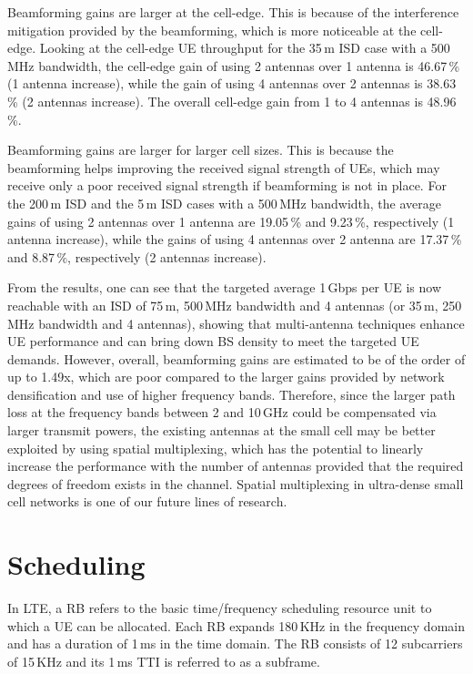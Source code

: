 \documentclass{IEEEtran}
\begin{document}
Beamforming gains are larger at the cell-edge.
This is because of the interference mitigation provided by the beamforming,
which is more noticeable at the cell-edge.
Looking at the cell-edge \ac{UE} throughput for the 35\,m \ac{ISD} case with a 500\,MHz bandwidth,
the cell-edge gain of using 2 antennas over 1 antenna is 46.67\,\% (1 antenna increase),
while the gain of using 4 antennas over 2 antennas is 38.63\,\% (2 antennas increase).
The overall cell-edge gain from 1 to 4 antennas is 48.96\,\%.



Beamforming gains are larger for larger cell sizes.
This is because the beamforming helps improving the received signal strength of \acp{UE},
which may receive only a poor received signal strength if beamforming is not in place.
For the 200\,m \ac{ISD} and the 5\,m \ac{ISD} cases with a 500\,MHz bandwidth,
the average gains of using 2 antennas over 1 antenna are 19.05\,\% and 9.23\,\%, respectively (1 antenna increase),
while the gains of using 4 antennas over 2 antenna are 17.37\,\% and 8.87\,\%, respectively (2 antennas increase).

From the results,
one can see that the targeted average 1\,Gbps per \ac{UE} is now reachable with an \ac{ISD} of 75\,m, 500\,MHz bandwidth and 4 antennas (or 35\,m, 250\,MHz bandwidth and 4 antennas),
showing that multi-antenna techniques enhance \ac{UE} performance and can bring down \ac{BS} density
to meet the targeted \ac{UE} demands.
However, overall, beamforming gains are estimated to be of the order of up to 1.49x,
which are poor compared to the larger gains provided by network densification and use of higher frequency bands.
Therefore, since the larger path loss at the frequency bands between 2 and 10\,GHz could be compensated via larger transmit powers,
the existing antennas at the small cell may be better exploited by using spatial multiplexing,
which has the potential to linearly increase the performance with the number of antennas
provided that the required degrees of freedom exists in the channel.
Spatial multiplexing in ultra-dense small cell networks is one of our future lines of research.

\section{Scheduling}
\label{Sec:scheduling}

In \ac{LTE}, a \ac{RB} refers to the basic time/frequency scheduling resource unit to which a \ac{UE} can be allocated.
Each \ac{RB} expands 180\,KHz in the frequency domain and has a duration of  1\,ms in the time domain.
The \ac{RB} consists of 12 subcarriers of 15\,KHz and its 1\,ms \ac{TTI} is referred to as a subframe.
\end{document}
